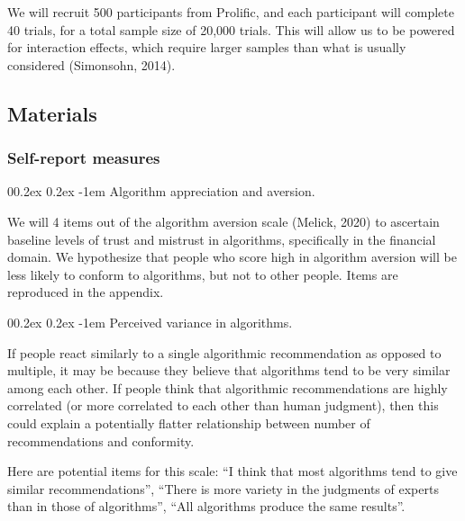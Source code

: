 \documentclass[
  man ,floatsintext]{apa7}
\makeatletter
\let\oldparagraph\paragraph
\renewcommand{\paragraph}[1]{\oldparagraph{#1}\mbox{}}
\renewcommand{\paragraph}{\@startsection{paragraph}{4}{\parindent}%
  {0\baselineskip \@plus 0.2ex \@minus 0.2ex}%
  {-1em}%
  {\normalfont\normalsize\bfseries\itshape\typesectitle}}
\renewcommand{\paragraph}{\@startsection{paragraph}{4}{\parindent}%
  {0\baselineskip \@plus 0.2ex \@minus 0.2ex}%
  {-1em}%
  {\normalfont\normalsize\bfseries\typesectitle}}
\makeatother
\begin{document}
We will recruit 500 participants from Prolific, and each participant will complete 40 trials, for a total sample size of 20,000 trials. This will allow us to be powered for interaction effects, which require larger samples than what is usually considered (Simonsohn, 2014).

\hypertarget{materials}{%
\subsection{Materials}\label{materials}}

\hypertarget{self-report-measures}{%
\subsubsection{Self-report measures}\label{self-report-measures}}

\hypertarget{algorithm-appreciation-and-aversion.}{%
\paragraph{Algorithm appreciation and aversion.}\label{algorithm-appreciation-and-aversion.}}

We will 4 items out of the algorithm aversion scale (Melick, 2020) to ascertain baseline levels of trust and mistrust in algorithms, specifically in the financial domain. We hypothesize that people who score high in algorithm aversion will be less likely to conform to algorithms, but not to other people. Items are reproduced in the appendix.

\hypertarget{perceived-variance-in-algorithms.}{%
\paragraph{Perceived variance in algorithms.}\label{perceived-variance-in-algorithms.}}

If people react similarly to a single algorithmic recommendation as opposed to multiple, it may be because they believe that algorithms tend to be very similar among each other. If people think that algorithmic recommendations are highly correlated (or more correlated to each other than human judgment), then this could explain a potentially flatter relationship between number of recommendations and conformity.

Here are potential items for this scale: ``I think that most algorithms tend to give similar recommendations'', ``There is more variety in the judgments of experts than in those of algorithms'', ``All algorithms produce the same results''.
\end{document}
